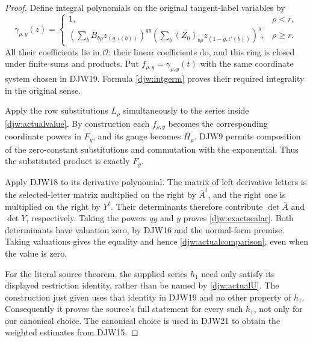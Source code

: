\begin{proof}
Define integral polynomials on the original tangent-label variables by
\[
 \gamma_{\rho,y}(z)=
 \begin{cases}
 1,&\rho<r,\\[2pt]
 \displaystyle
 \left(\sum_b\bar B_{b\rho}z_{(g,\iota(b))}\right)^{qy}
 \left(\sum_b(Z_0)_{b\rho}z_{(1-g,\iota'(b))}\right)^y,
      &\rho\ge r.
 \end{cases}
\]
All their coefficients lie in $\mathcal O$: their linear
coefficients do, and this ring is closed under finite sums and
products.  Put $f_{\rho,y}=\gamma_{\rho,y}(t)$ with the same
coordinate system chosen in DJW19.  Formula \eqref{djw:intgerm}
proves their required integrality in the original sense.

Apply the row substitutions $L_\rho$ simultaneously to the series
inside \eqref{djw:actualvalue}.  By construction each
$f_{\rho,y}$ becomes the corresponding coordinate powers in $F_y$,
and its gauge becomes $H_\rho$.  DJW9 permits composition of the
zero-constant substitutions and commutation with the exponential.
Thus the substituted product is exactly $F_y$.

Apply DJW18 to its derivative polynomial.
The matrix of left derivative letters is the selected-letter
matrix multiplied on the right by $\bar A^t$, and the right
one is multiplied on the right by $Y^t$.  Their determinants
therefore contribute $\det\bar A$ and $\det Y$, respectively.
Taking the powers $qy$ and $y$ proves \eqref{djw:exactscalar}.
Both determinants have valuation zero, by DJW16 and the normal-form
premise.  Taking valuations gives the equality and hence
\eqref{djw:actualcomparison}, even when the value is zero.

For the literal source theorem, the supplied series $h_1$ need
only satisfy its displayed restriction identity, rather than be
named by \eqref{djw:actualU}.  The construction just given uses
that identity in DJW19 and no other property of $h_1$.
Consequently it proves the source's full statement for every such
$h_1$, not only for our canonical choice.  The canonical choice
is used in DJW21 to obtain the weighted estimates from DJW15.
\end{proof}

